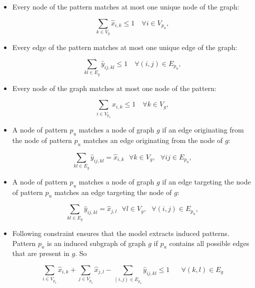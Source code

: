 \begin{itemize}
\item Every node of the pattern matches at most one unique node of the graph:

\begin{equation}
\sum_{k\in V_g}\hat{x}_{i,k} \leq 1 \quad \forall i\in V_{p_{u}},
\end{equation}

\item Every edge of the pattern matches at most one unique edge of the graph:

\begin{equation}
\sum_{kl\in E_g}\hat{y}_{ij,kl} \leq 1 \quad \forall (i,j)\in E_{p_{u}},
\end{equation}

\item Every node of the graph matches at most one node of the pattern:

\begin{equation}
\sum_{i\in V_{p_{u}}}\hat{x}_{i,k} \leq 1 \quad \forall k\in V_g,
\end{equation}

\item A node of pattern $p_u$ matches a node of graph $g$ if an edge originating from the node of pattern $p_u$ matches an edge originating from the node of $g$:

\begin{equation}
\sum_{kl \in E_g}\hat{y}_{ij,kl} =  \hat{x}_{i,k}\textit{  }\forall k \in V_g, \textit{  }\forall ij \in E_{p_{u}},
\end{equation}

\item A node of pattern $p_u$ matches a node of graph $g$ if an edge targeting the node of pattern $p_u$ matches an edge targeting the node of $g$:

\begin{equation}
\sum_{kl \in E_g}\hat{y}_{ij,kl} =  \hat{x}_{j,l}\textit{  }\forall l \in V_g,\textit{  }\forall (i,j) \in E_{p_{u}},
\end{equation}

\item Following constraint ensures that the model extracts induced patterns.  
Pattern $p_{u}$ is an induced subgraph of graph $g$ if $p_{u}$ contains all possible edges that are present in $g$. 
So

\begin{equation}
\sum_{i \in V_{p_{u}}}\hat{x}_{i,k} + \sum_{j \in V_{p_{u}}}\hat{x}_{j,l} - \sum_{(i,j)\in E_{p_{u}}}\hat{y}_{ij,kl} \leq 1
 \quad\textit{  }\forall (k,l)\in E_g
\end{equation}
\end{itemize}


